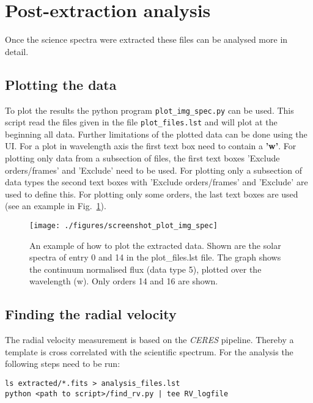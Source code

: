 \documentclass[10pt,a4paper]{article}
\begin{document}

\newpage
\section{Post-extraction analysis}

\noindent Once the science spectra were extracted these files can be analysed more in detail. 

\subsection{Plotting the data}

To plot the results the python program \verb|plot_img_spec.py| can be used. This script read the files given in the file \verb|plot_files.lst| and will plot at the beginning all data. Further limitations of the plotted data can be done using the UI. For a plot in wavelength axis the first text box need to contain a \textbf{'w'}. For plotting only data from a subsection of files, the first text boxes 'Exclude orders/frames' and 'Exclude' need to be used. For plotting only a subsection of data types the second text boxes with 'Exclude orders/frames' and 'Exclude' are used to define this. For plotting only some orders, the last text boxes are used (see an example in Fig.~\ref{figure_plotting_results_example}).

\begin{figure} 
  \begin{center}
    \texttt{[image: ./figures/screenshot\_plot\_img\_spec]}
  \end{center} 
  \caption{An example of how to plot the extracted data. Shown are the solar spectra of entry 0 and 14 in the plot\_files.lst file. The graph shows the continuum normalised flux (data type 5), plotted over the wavelength (w). Only orders 14 and 16 are shown.
    \label{figure_plotting_results_example}}
\end{figure}


\subsection{Finding the radial velocity }

\noindent The radial velocity measurement is based on the \textit{CERES} pipeline. Thereby a template is cross correlated with the scientific spectrum. For the analysis the following steps need to be run:
\begin{lstlisting}[style=base]
ls extracted/*.fits > analysis_files.lst
python <path to script>/find_rv.py | tee RV_logfile
\end{lstlisting}
\end{document}

